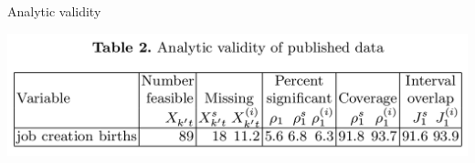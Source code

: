 \begin{frame}[fragile]{Analytic validity}
\begin{center}
%


\includegraphics[width=\textwidth]{table2}

\end{center}
\end{frame}

